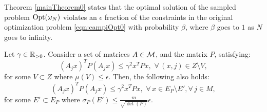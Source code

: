 Theorem \ref{mainTheorem0} states that the optimal solution of the sampled problem $\text{Opt}(\omega_N)$ violates an $\epsilon$ fraction of the constraints in the original optimization problem  \eqref{eqn:campiOpt0} with probability $\beta$, where $\beta$ goes to $1$ as $N$ goes to infinity.


\begin{theorem}\label{thm:mainTheorem01}Let $\gamma \in \mathbb{R}_{> 0}$. Consider a set of matrices $A \in \mathcal{M}$, and the matrix $P$, satisfying:
\begin{equation*}(A_j x)^TP(A_j x) \leq {\gamma}^2x^TPx,\,\, \forall\, (x, j) \in Z \setminus V,\end{equation*}
for some $V \subset Z$ where $\mu(V) \leq \epsilon$. Then, the following also holds:
\begin{equation*}\label{eqn:thm01-2}(A_j x)^TP(A_j x) \leq {\gamma}^2x^TPx,\,\, \forall\, x \in E_P \setminus E', \forall\, j \in M,\end{equation*}
for some $E' \subset E_P$ where $\sigma_P(E') \leq \frac{m}{\sqrt{\det(P)}}\epsilon$.
\end{theorem}

